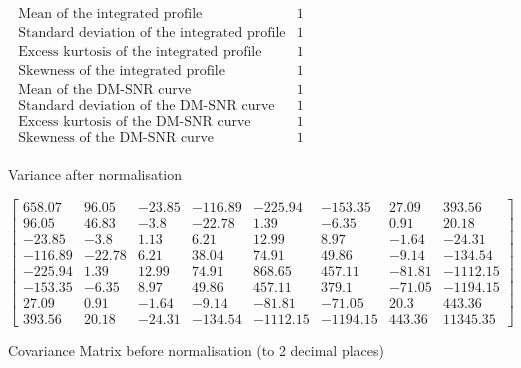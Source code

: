 \documentclass[a4paper,12pt]{article}
\begin{document}
    \begin{figure}[ht!]
        \begin{math}
            \begin{array}{lcr}
                \mbox{ Mean of the integrated profile} & 1 \\
                \mbox{ Standard deviation of the integrated profile} & 1 \\
                \mbox{ Excess kurtosis of the integrated profile} & 1 \\
                \mbox{ Skewness of the integrated profile} & 1 \\
                \mbox{ Mean of the DM-SNR curve} & 1 \\
                \mbox{ Standard deviation of the DM-SNR curve} & 1 \\
                \mbox{ Excess kurtosis of the DM-SNR curve} & 1 \\
                \mbox{ Skewness of the DM-SNR curve} & 1 \\
            \end{array}
        \end{math}
        \caption{Variance after normalisation}
    \end{figure}

    \newpage

    \setcounter{MaxMatrixCols}{20}
    \begin{figure}[ht!]
        \centering
        \begin{math}
            \begin{bmatrix}
                658.07&96.05&-23.85&-116.89&-225.94&-153.35&27.09&393.56\\
                96.05&46.83&-3.8&-22.78&1.39&-6.35&0.91&20.18\\
                -23.85&-3.8&1.13&6.21&12.99&8.97&-1.64&-24.31\\
                -116.89&-22.78&6.21&38.04&74.91&49.86&-9.14&-134.54\\
                -225.94&1.39&12.99&74.91&868.65&457.11&-81.81&-1112.15\\
                -153.35&-6.35&8.97&49.86&457.11&379.1&-71.05&-1194.15\\
                27.09&0.91&-1.64&-9.14&-81.81&-71.05&20.3&443.36\\
                393.56&20.18&-24.31&-134.54&-1112.15&-1194.15&443.36&11345.35
            \end{bmatrix}
        \end{math}
        \caption{Covariance Matrix before normalisation (to 2 decimal places)}
    \end{figure}
\end{document}

